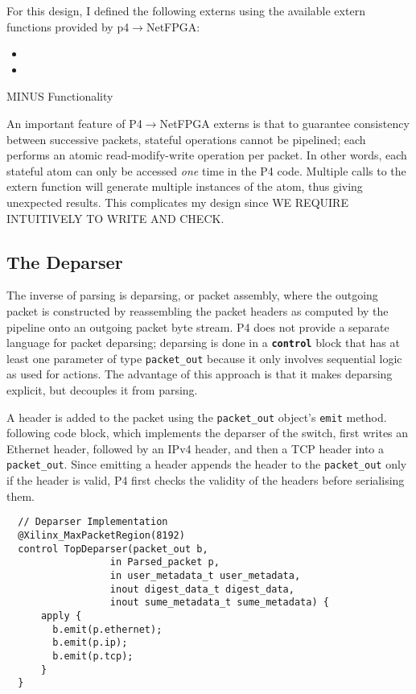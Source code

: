 For this design, I defined the following externs using the available extern functions provided by p4$\rightarrow$NetFPGA:
\begin{itemize}
	\item 
	\item 
\end{itemize}
MINUS Functionality

An important feature of P4$\rightarrow$NetFPGA externs is that to guarantee consistency between successive packets, stateful operations cannot be pipelined; each performs an atomic read-modify-write operation per packet. In other words, each stateful atom can only be accessed \textit{one} time in the P4 code. Multiple calls to the extern function will generate multiple instances of the atom, thus giving unexpected results. This complicates my design since WE REQUIRE INTUITIVELY TO WRITE AND CHECK.

	\subsection{The Deparser}
The inverse of parsing is deparsing, or packet assembly, where the outgoing packet is constructed by reassembling the packet headers as computed by the pipeline onto an outgoing packet byte stream. P4 does not provide a separate language for packet deparsing; deparsing is done in a \textbf{\texttt{control}} block that has at least one parameter of type \verb|packet_out| because it only involves sequential logic as used for actions. The advantage of this approach is that it makes deparsing explicit, but decouples it from parsing. 

A header is added to the packet using the \verb|packet_out| object's \texttt{emit} method. following code block, which implements the deparser of the switch, first writes an Ethernet header, followed by an IPv4 header, and then a TCP header into a \verb|packet_out|. Since emitting a header appends the header to the \verb|packet_out| only if the header is valid, P4 first checks the validity of the headers before serialising them.

{\renewcommand{\baselinestretch}{0.8}\small
\begin{verbatim}
  // Deparser Implementation
  @Xilinx_MaxPacketRegion(8192)
  control TopDeparser(packet_out b,
                  in Parsed_packet p,
                  in user_metadata_t user_metadata,
                  inout digest_data_t digest_data, 
                  inout sume_metadata_t sume_metadata) { 
      apply {
        b.emit(p.ethernet); 
        b.emit(p.ip);
        b.emit(p.tcp);
      }
  }
\end{verbatim}
}

